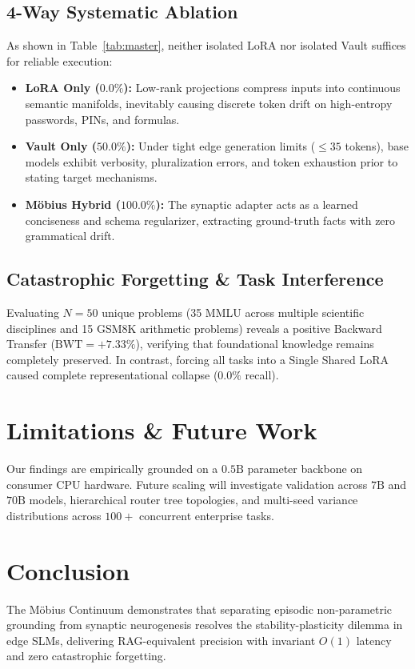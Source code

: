 \documentclass[10pt,twocolumn,letterpaper]{article}
\begin{document}
\subsection{4-Way Systematic Ablation}
As shown in Table~\ref{tab:master}, neither isolated LoRA nor isolated Vault suffices for reliable execution:
\begin{itemize}
    \item \textbf{LoRA Only ($0.0\%$):} Low-rank projections compress inputs into continuous semantic manifolds, inevitably causing discrete token drift on high-entropy passwords, PINs, and formulas.
    \item \textbf{Vault Only ($50.0\%$):} Under tight edge generation limits ($\le 35$ tokens), base models exhibit verbosity, pluralization errors, and token exhaustion prior to stating target mechanisms.
    \item \textbf{Möbius Hybrid ($100.0\%$):} The synaptic adapter acts as a learned conciseness and schema regularizer, extracting ground-truth facts with zero grammatical drift.
\end{itemize}

\subsection{Catastrophic Forgetting & Task Interference}
Evaluating $N=50$ unique problems (35 MMLU across multiple scientific disciplines and 15 GSM8K arithmetic problems) reveals a positive Backward Transfer ($\text{BWT} = +7.33\%$), verifying that foundational knowledge remains completely preserved. In contrast, forcing all tasks into a Single Shared LoRA caused complete representational collapse ($0.0\%$ recall).

\section{Limitations & Future Work}
Our findings are empirically grounded on a $0.5\text{B}$ parameter backbone on consumer CPU hardware. Future scaling will investigate validation across $7\text{B}$ and $70\text{B}$ models, hierarchical router tree topologies, and multi-seed variance distributions across $100+$ concurrent enterprise tasks.

\section{Conclusion}
The Möbius Continuum demonstrates that separating episodic non-parametric grounding from synaptic neurogenesis resolves the stability-plasticity dilemma in edge SLMs, delivering RAG-equivalent precision with invariant $O(1)$ latency and zero catastrophic forgetting.
\end{document}
